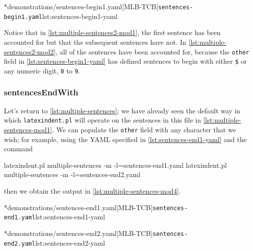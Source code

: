 	\begin{minipage}{.55\linewidth}
	\end{minipage}
	\hfill
	\begin{minipage}{.45\linewidth}
		\cmhlistingsfromfile[style=yaml-LST]*{demonstrations/sentences-begin1.yaml}[MLB-TCB]{\texttt{sentences-begin1.yaml}}{lst:sentences-begin1-yaml}
	\end{minipage}
	Notice that in \cref{lst:multiple-sentences2-mod1}, the first sentence has been accounted for but
	that the subsequent sentences have not. In \cref{lst:multiple-sentences2-mod2}, all of the
	sentences have been accounted for, because the \texttt{other} field in
	\cref{lst:sentences-begin1-yaml} has defined sentences to begin with either
	\lstinline!$! or any numeric digit, \texttt{0} to
	\texttt{9}.

\subsubsection{sentencesEndWith}
	Let's return to \vref{lst:multiple-sentences}; we have already seen the default way in
	which \texttt{latexindent.pl} will operate on the sentences in this file in
	\vref{lst:multiple-sentences-mod1}. We can populate the \texttt{other} field with
	any character that we wish; for example, using the YAML specified in
	\cref{lst:sentences-end1-yaml} and the command
	\begin{commandshell}
latexindent.pl multiple-sentences -m -l=sentences-end1.yaml
latexindent.pl multiple-sentences -m -l=sentences-end2.yaml
\end{commandshell}
	then we obtain the output in \cref{lst:multiple-sentences-mod4}.

	\begin{minipage}{.5\linewidth}
	\end{minipage}
	\hfill
	\begin{minipage}{.5\linewidth}
		\cmhlistingsfromfile[style=yaml-LST]*{demonstrations/sentences-end1.yaml}[MLB-TCB]{\texttt{sentences-end1.yaml}}{lst:sentences-end1-yaml}
	\end{minipage}

	\begin{minipage}{.5\linewidth}
	\end{minipage}
	\hfill
	\begin{minipage}{.5\linewidth}
		\cmhlistingsfromfile[style=yaml-LST]*{demonstrations/sentences-end2.yaml}[MLB-TCB]{\texttt{sentences-end2.yaml}}{lst:sentences-end2-yaml}
	\end{minipage}

